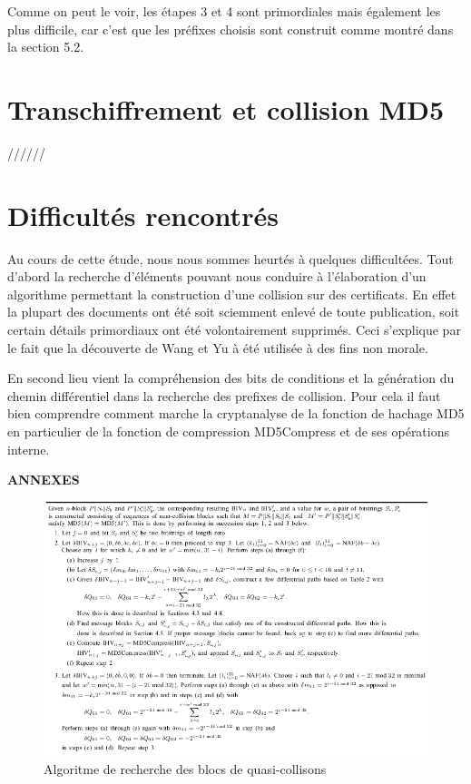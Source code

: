 \documentclass[a4paper,11pt,french]{article}
\begin{document}
Comme on peut le voir, les étapes 3 et 4 sont primordiales mais également les plus difficile, car c'est que les préfixes choisis sont construit comme montré dans la section 5.2.

\section{Transchiffrement et collision MD5}

//////


\section{Difficultés rencontrés}
Au cours de cette étude, nous nous sommes heurtés à quelques difficultées. Tout d'abord la recherche d'éléments pouvant nous conduire à l'élaboration d'un algorithme permettant la construction d'une collision sur des certificats. En effet la plupart des documents ont été soit sciemment enlevé de toute publication, soit certain détails primordiaux ont été volontairement supprimés. Ceci s'explique par le fait que la découverte de Wang et Yu à été utilisée à des fins non morale.

En second lieu vient la compréhension des bits de conditions et la génération du chemin différentiel dans la recherche des prefixes de collision. Pour cela il faut bien comprendre comment marche la cryptanalyse de la fonction de hachage MD5 en particulier de la fonction de compression MD5Compress et de ses opérations interne.



\newpage
\vspace{3cm}
\bf{\LARGE{ANNEXES}}\\

\begin{figure}[h!]
  \includegraphics[scale=.61]{./pics/ncb.png}
  \caption{Algoritme de recherche des blocs de quasi-collisons}
\end{figure}
\end{document}
